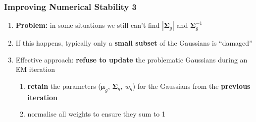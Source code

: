 \documentclass[usenames,dvipsnames]{beamer}
\def\Mat#1{{\boldsymbol{#1}}}
\begin{document}
\begin{frame}
\frametitle{Improving Numerical Stability 3}

\begin{enumerate}[{~~$\boldsymbol{\bullet}$}]

\item {\bf Problem:} in some situations we still can't find $|\Mat{\Sigma}_g|$ and $\Mat{\Sigma}_g^{-1}$
\vspace{1ex}

\item If this happens, typically only a {\bf small subset} of the Gaussians is ``damaged''
\vspace{1ex}

\item Effective approach: {\bf refuse to update} the problematic Gaussians during an EM iteration

\begin{enumerate}[{$\boldsymbol{\rightarrow}$}]
\renewcommand{\itemsep}{1ex}
\item {\bf retain} the parameters ($\Mat{\mu}_g$, $\Mat{\Sigma}_g$, $w_g$) for the Gaussians from the {\bf previous iteration}
\item normalise all weights to ensure they sum to 1
\end{enumerate}
\vspace{1ex}


\end{enumerate}
\end{frame}

%
%
%
\end{document}
